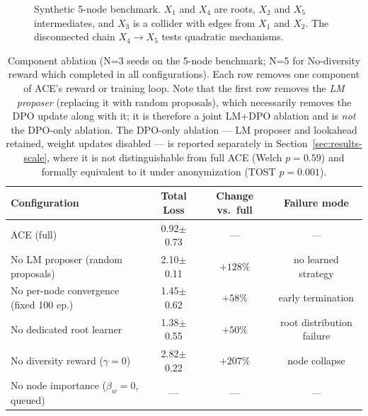 \documentclass[twoside]{article}
\theoremstyle{plain}
\theoremstyle{definition}
\theoremstyle{remark}
\begin{document}
\begin{figure}[h]
\centering
{}
\caption{Synthetic 5-node benchmark. $X_1$ and $X_4$ are roots, $X_2$ and $X_5$ intermediates, and $X_3$ is a collider with edges from $X_1$ and $X_2$. The disconnected chain $X_4 \to X_5$ tests quadratic mechanisms.}
\label{fig:synthetic-scm}
\end{figure}

\begin{table}[h]
\centering
\caption{Component ablation (N=3 seeds on the 5-node benchmark; N=5 for No-diversity reward which completed in all configurations). Each row removes one component of ACE's reward or training loop. Note that the first row removes the \emph{LM proposer} (replacing it with random proposals), which necessarily removes the DPO update along with it; it is therefore a joint LM+DPO ablation and is \emph{not} the DPO-only ablation. The DPO-only ablation --- LM proposer and lookahead retained, weight updates disabled --- is reported separately in Section~\ref{sec:results-scale}, where it is not distinguishable from full ACE (Welch $p=0.59$) and formally equivalent to it under anonymization (TOST $p=0.001$).}
\label{tab:ablations}
\small
\begin{tabular}{@{}lccc@{}}
\toprule
Configuration & Total Loss & Change vs.\ full & Failure mode \\
\midrule
ACE (full) & 0.92$\pm$0.73 & --- & --- \\
\midrule
No LM proposer (random proposals) & 2.10$\pm$0.11 & $+128\%$ & no learned strategy \\
No per-node convergence (fixed 100 ep.) & 1.45$\pm$0.62 & $+58\%$ & early termination \\
No dedicated root learner & 1.38$\pm$0.55 & $+50\%$ & root distribution failure \\
No diversity reward ($\gamma=0$) & 2.82$\pm$0.22 & $+207\%$ & node collapse \\
No node importance ($\beta_w=0$, queued) & --- & --- & --- \\
\bottomrule
\end{tabular}
\end{table}
\end{document}
